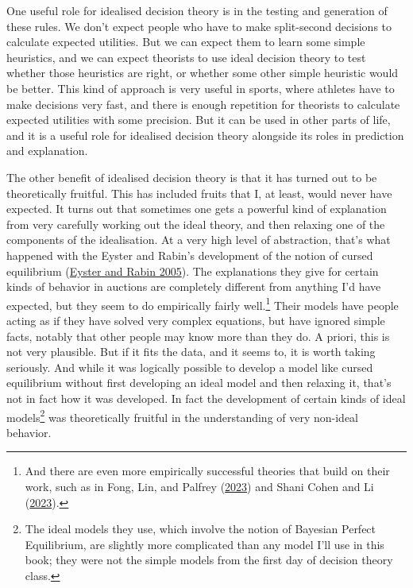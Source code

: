 \documentclass[
  12pt,
  letterpaper,
  DIV=11,
  numbers=noendperiod]{scrreprt}
\begin{document}
One useful role for idealised decision theory is in the testing and
generation of these rules. We don't expect people who have to make
split-second decisions to calculate expected utilities. But we can
expect them to learn some simple heuristics, and we can expect theorists
to use ideal decision theory to test whether those heuristics are right,
or whether some other simple heuristic would be better. This kind of
approach is very useful in sports, where athletes have to make decisions
very fast, and there is enough repetition for theorists to calculate
expected utilities with some precision. But it can be used in other
parts of life, and it is a useful role for idealised decision theory
alongside its roles in prediction and explanation.

The other benefit of idealised decision theory is that it has turned out
to be theoretically fruitful. This has included fruits that I, at least,
would never have expected. It turns out that sometimes one gets a
powerful kind of explanation from very carefully working out the ideal
theory, and then relaxing one of the components of the idealisation. At
a very high level of abstraction, that's what happened with the Eyster
and Rabin's development of the notion of cursed equilibrium
(\protect\hyperlink{ref-EysterRabin2005}{Eyster and Rabin 2005}). The
explanations they give for certain kinds of behavior in auctions are
completely different from anything I'd have expected, but they seem to
do empirically fairly well.\footnote{And there are even more empirically
  successful theories that build on their work, such as in Fong, Lin,
  and Palfrey (\protect\hyperlink{ref-fong2023cursed}{2023}) and Shani
  Cohen and Li (\protect\hyperlink{ref-cohen2023sequential}{2023}).}
Their models have people acting as if they have solved very complex
equations, but have ignored simple facts, notably that other people may
know more than they do. A priori, this is not very plausible. But if it
fits the data, and it seems to, it is worth taking seriously. And while
it was logically possible to develop a model like cursed equilibrium
without first developing an ideal model and then relaxing it, that's not
in fact how it was developed. In fact the development of certain kinds
of ideal models\footnote{The ideal models they use, which involve the
  notion of Bayesian Perfect Equilibrium, are slightly more complicated
  than any model I'll use in this book; they were not the simple models
  from the first day of decision theory class.} was theoretically
fruitful in the understanding of very non-ideal behavior.
\end{document}
